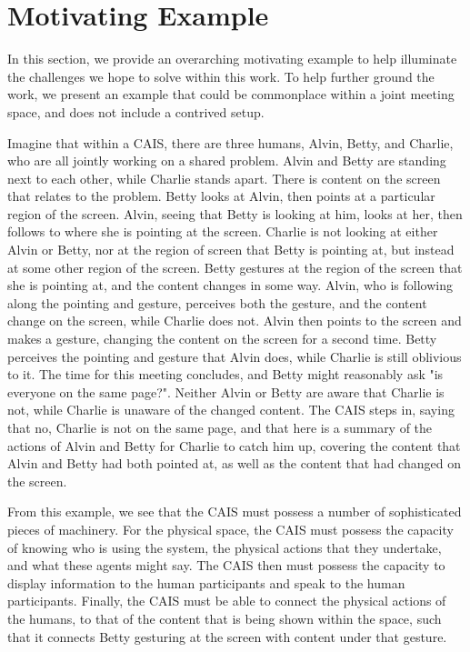 \section{Motivating Example}

In this section, we provide an overarching motivating example to help
illuminate the challenges we hope to solve within this work. To help further
ground the work, we present an example that could be commonplace within a joint
meeting space, and does not include a contrived setup.

Imagine that within a CAIS, there are three humans, Alvin, Betty, and Charlie,
who are all jointly working on a shared problem. Alvin and Betty are standing
next to each other, while Charlie stands apart. There is content on the screen
that relates to the problem. Betty looks at Alvin, then points at a particular
region of the screen. Alvin, seeing that Betty is looking at him, looks at her,
then follows to where she is pointing at the screen. Charlie is not looking at
either Alvin or Betty, nor at the region of screen that Betty is pointing at,
but instead at some other region of the screen. Betty gestures at the region of
the screen that she is pointing at, and the content changes in some way. Alvin,
who is following along the pointing and gesture, perceives both the gesture, and
the content change on the screen, while Charlie does not. Alvin then points to
the screen and makes a gesture, changing the content on the screen for a second
time. Betty perceives the pointing and gesture that Alvin does, while Charlie is
still oblivious to it. The time for this meeting concludes, and Betty might
reasonably ask "is everyone on the same page?". Neither Alvin or Betty are aware
that Charlie is not, while Charlie is unaware of the changed content. The
CAIS steps in, saying that no, Charlie is not on the same page, and that here
is a summary of the actions of Alvin and Betty for Charlie to catch him up,
covering the content that Alvin and Betty had both pointed at, as well as
the content that had changed on the screen.

From this example, we see that the CAIS must possess a number of sophisticated
pieces of machinery. For the physical space, the CAIS must possess the capacity
of knowing who is using the system, the physical actions that they
undertake, and what these agents might say. The CAIS then must possess the
capacity to display information to the human participants and speak to the
human participants. Finally, the CAIS must be able to connect the physical
actions of the humans, to that of the content that is being shown within the
space, such that it connects Betty gesturing at the screen with content under
that gesture.
